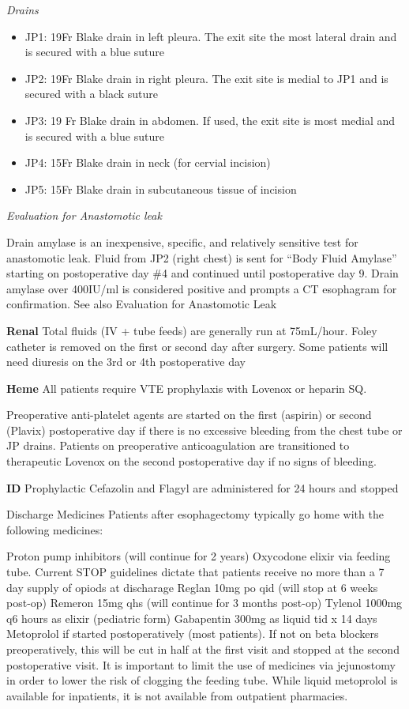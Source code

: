 \documentclass[
]{book}
\providecommand{\tightlist}{%
  \setlength{\itemsep}{0pt}\setlength{\parskip}{0pt}}
\begin{document}
\emph{Drains}

\begin{itemize}
\tightlist
\item
  JP1: 19Fr Blake drain in left pleura. The exit site the most lateral drain and is secured with a blue suture
\item
  JP2: 19Fr Blake drain in right pleura. The exit site is medial to JP1 and is secured with a black suture
\item
  JP3: 19 Fr Blake drain in abdomen. If used, the exit site is most medial and is secured with a blue suture
\item
  JP4: 15Fr Blake drain in neck (for cervial incision)
\item
  JP5: 15Fr Blake drain in subcutaneous tissue of incision
\end{itemize}

\emph{Evaluation for Anastomotic leak}

Drain amylase is an inexpensive, specific, and relatively sensitive test for anastomotic leak. Fluid from JP2 (right chest) is sent for ``Body Fluid Amylase'' starting on postoperative day \#4 and continued until postoperative day 9. Drain amylase over 400IU/ml is considered positive and prompts a CT esophagram for confirmation. See also Evaluation for Anastomotic Leak

\textbf{Renal}
Total fluids (IV + tube feeds) are generally run at 75mL/hour. Foley catheter is removed on the first or second day after surgery. Some patients will need diuresis on the 3rd or 4th postoperative day

\textbf{Heme}
All patients require VTE prophylaxis with Lovenox or heparin SQ.

Preoperative anti-platelet agents are started on the first (aspirin) or second (Plavix) postoperative day if there is no excessive bleeding from the chest tube or JP drains. Patients on preoperative anticoagulation are transitioned to therapeutic Lovenox on the second postoperative day if no signs of bleeding.

\textbf{ID}
Prophylactic Cefazolin and Flagyl are administered for 24 hours and stopped

Discharge Medicines
Patients after esophagectomy typically go home with the following medicines:

Proton pump inhibitors (will continue for 2 years)
Oxycodone elixir via feeding tube. Current STOP guidelines dictate that patients receive no more than a 7 day supply of opiods at discharage
Reglan 10mg po qid (will stop at 6 weeks post-op)
Remeron 15mg qhs (will continue for 3 months post-op)
Tylenol 1000mg q6 hours as elixir (pediatric form)
Gabapentin 300mg as liquid tid x 14 days
Metoprolol if started postoperatively (most patients). If not on beta blockers preoperatively, this will be cut in half at the first visit and stopped at the second postoperative visit. It is important to limit the use of medicines via jejunostomy in order to lower the risk of clogging the feeding tube. While liquid metoprolol is available for inpatients, it is not available from outpatient pharmacies.
\end{document}
